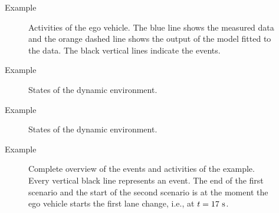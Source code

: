\documentclass[aspectratio=\AspectR,10pt,compress,t]{beamer} %
\newlength\figurewidth
\newlength\figureheight
\begin{document}
\begin{frame}{Example}
	\vspace{-1em}
	\begin{figure}
		\centering
		\setlength\figureheight{140pt}
		\setlength\figurewidth{248pt}
		
		\caption{Activities of the ego vehicle. The blue line shows the measured data and the orange dashed line shows the output of the model fitted to the data. The black vertical lines indicate the events.}
	\end{figure}
\end{frame}

\begin{frame}{Example}
	\vspace{-1em}
	\begin{figure}
		\centering
		\setlength\figureheight{140pt}
		\setlength\figurewidth{248pt}
		
		\caption{States of the dynamic environment.}
	\end{figure}
\end{frame}

\begin{frame}{Example}
	\vspace{-1em}
	\begin{figure}
		\centering
		\setlength\figureheight{140pt}
		\setlength\figurewidth{248pt}
		
		\caption{States of the dynamic environment.}
	\end{figure}
\end{frame}

\begin{frame}{Example}
	\vspace{-1em}
	\begin{figure}
		\centering
		\setlength\figureheight{155pt}
		\setlength\figurewidth{450pt}
		
		\vspace{-1em}
		\caption{Complete overview of the events and activities of the example. Every vertical black line represents an event. The end of the first scenario and the start of the second scenario is at the moment the ego vehicle starts the first lane change, i.e., at $t=17\ \textup{s}$.}
	\end{figure}
\end{frame}
\end{document}
